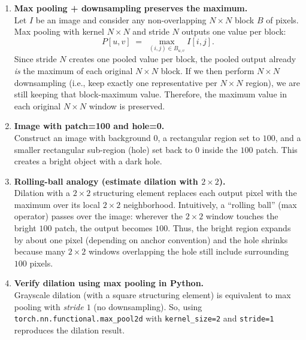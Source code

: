 \documentclass[11pt]{article}
\begin{document}
	\begin{enumerate}[label=\textbf{\Alph*.}, leftmargin=1.2cm]
		
		\item \textbf{Max pooling + downsampling preserves the maximum.}\\
		Let $I$ be an image and consider any non-overlapping $N\times N$ block $B$ of pixels. Max pooling with kernel $N\times N$ and stride $N$ outputs one value per block:
		\[
		P[u,v] \;=\; \max_{(i,j)\in B_{u,v}} I[i,j].
		\]
		Since stride $N$ creates one pooled value per block, the pooled output already \emph{is} the maximum of each original $N\times N$ block. If we then perform $N\times N$ downsampling (i.e., keep exactly one representative per $N\times N$ region), we are still keeping that block-maximum value. Therefore, the maximum value in each original $N\times N$ window is preserved.
		
		\item \textbf{Image with patch=100 and hole=0.}\\
		Construct an image with background $0$, a rectangular region set to $100$, and a smaller rectangular sub-region (hole) set back to $0$ inside the $100$ patch. This creates a bright object with a dark hole.
		
		\item \textbf{Rolling-ball analogy (estimate dilation with $2\times 2$).}\\
		Dilation with a $2\times 2$ structuring element replaces each output pixel with the maximum over its local $2\times 2$ neighborhood. Intuitively, a “rolling ball” (max operator) passes over the image: wherever the $2\times 2$ window touches the bright $100$ patch, the output becomes $100$. Thus, the bright region expands by about one pixel (depending on anchor convention) and the hole shrinks because many $2\times 2$ windows overlapping the hole still include surrounding $100$ pixels.
		
		\item \textbf{Verify dilation using max pooling in Python.}\\
		Grayscale dilation (with a square structuring element) is equivalent to max pooling with \emph{stride $1$} (no downsampling). So, using \texttt{torch.nn.functional.max\_pool2d} with \texttt{kernel\_size=2} and \texttt{stride=1} reproduces the dilation result.
		

\end{enumerate}
\end{document}
